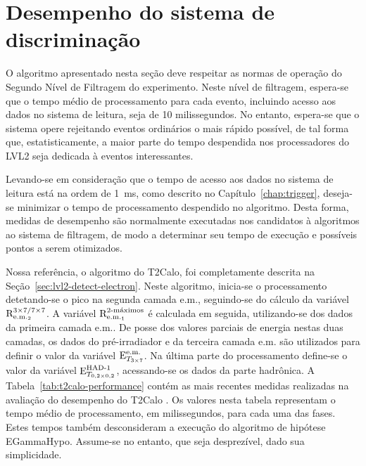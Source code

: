 \typeout{ ====================================================================}
\typeout{ ====================================================================}

\chapter{Desempenho do sistema de discriminação}
\label{chap:implement}

O algoritmo apresentado nesta seção deve respeitar as normas de operação do
Segundo Nível de Filtragem do experimento. Neste nível de filtragem, espera-se
que o tempo médio de processamento para cada evento, incluindo acesso aos
dados no sistema de leitura, seja de 10 milissegundos. No entanto, espera-se
que o sistema opere rejeitando eventos ordinários o mais rápido possível, de
tal forma que, estatisticamente, a maior parte do tempo despendida nos
processadores do LVL2 seja dedicada à eventos interessantes.

Levando-se em consideração que o tempo de acesso aos dados no sistema de
leitura está na ordem de 1~ms, como descrito no Capítulo~\ref{chap:trigger},
deseja-se minimizar o tempo de processamento despendido no algoritmo. Desta
forma, medidas de desempenho são normalmente executadas nos candidatos à
algoritmos ao sistema de filtragem, de modo a determinar seu tempo de execução
e possíveis pontos a serem otimizados.

Nossa referência, o algoritmo do T2Calo, foi completamente descrita na
Seção~\ref{sec:lvl2-detect-electron}. Neste algoritmo, inicia-se o
processamento detetando-se o pico na segunda camada e.m., seguindo-se do
cálculo da variável $\rcore$. A variável $\eratio$ é calculada em seguida,
utilizando-se dos dados da primeira camada e.m.. De posse dos valores parciais
de energia nestas duas camadas, os dados do pré-irradiador e da terceira
camada e.m. são utilizados para definir o valor da variável $\etem$. Na última
parte do processamento define-se o valor da variável $\ethad$, acessando-se os
dados da parte hadrônica. A Tabela~\ref{tab:t2calo-performance} contém as mais
recentes medidas realizadas na avaliação do desempenho do T2Calo
\cite{denis-presentation}. Os valores nesta tabela representam o tempo médio
de processamento, em milissegundos, para cada uma das fases. Estes tempos
também desconsideram a execução do algoritmo de hipótese EGammaHypo. Assume-se
no entanto, que seja desprezível, dado sua simplicidade.


